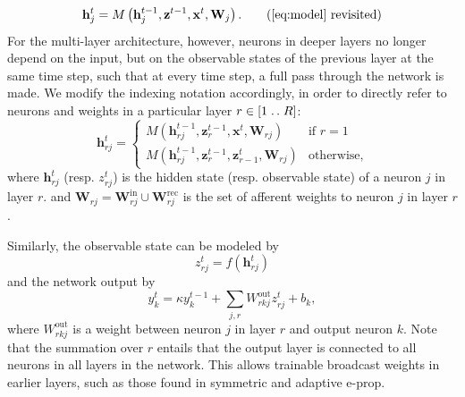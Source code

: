         \begin{equation}
        \mathbf{h}^t_j = M\left(\mathbf{h}_j^{t-1}, \mathbf{z}^{t-1}, \mathbf{x}^t, \mathbf{W}_j\right).\tag{\ref{eq:model} revisited}
        \end{equation}
        For the multi-layer architecture, however, neurons in deeper layers no longer depend on the input, but on the observable states of the previous layer at the same time step, such that at every time step, a full pass through the network is made.
        We modify the indexing notation accordingly, in order to directly refer to neurons and weights in a particular layer $r \in [1\mathrel{{.}\,{.}}\nobreak R]$:
        \begin{equation}\label{eq:ml_model}
        \mathbf{h}^t_{rj} = \begin{cases}
        M\left(\mathbf{h}_{rj}^{t-1}, \mathbf{z}_r^{t-1}, \mathbf{x}^t, \mathbf{W}_{rj}\right)       & \mbox{if } r = 1\\
        M\left(\mathbf{h}_{rj}^{t-1}, \mathbf{z}_r^{t-1}, \mathbf{z}_{r-1}^t, \mathbf{W}_{rj}\right) & \mbox{otherwise,}
        \end{cases}
        \end{equation}
        where $\mathbf{h}^t_{rj}$ (resp. $z^t_{rj}$) is the hidden state (resp. observable state) of a neuron $j$ in layer $r$. and $\mathbf{W}_{rj} = \mathbf{W}^\text{in}_{rj} \cup \mathbf{W}^\text{rec}_{rj}$ is the set of afferent weights to neuron $j$ in layer $r$.

        Similarly, the observable state can be modeled by
        \begin{equation}\label{eq:ml_model_obs}
        z^t_{rj} = f\left(\mathbf{h}_{rj}^t\right)
        \end{equation}
        and the network output by
        \begin{equation}
        y^t_k = \kappa y^{t-1}_k + \sum_{j,r}W^\text{out}_{rkj}z_{rj}^t + b_k,
        \end{equation}
        where $W^\text{out}_{rkj}$ is a weight between neuron $j$ in layer $r$ and output neuron $k$.
        Note that the summation over $r$ entails that the output layer is connected to all neurons in all layers in the network.
        This allows trainable broadcast weights in earlier layers, such as those found in symmetric and adaptive e-prop.

